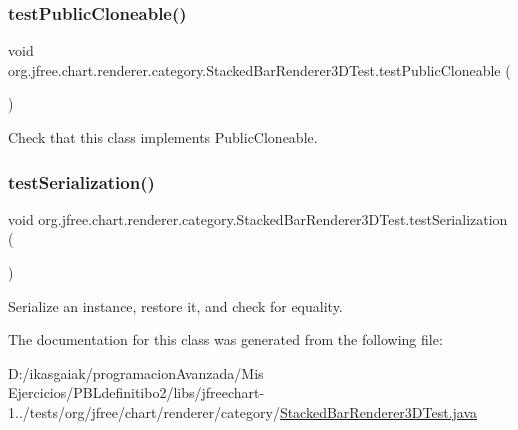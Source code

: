 \subsubsection{\texorpdfstring{test\+Public\+Cloneable()}{testPublicCloneable()}}
{\footnotesize\ttfamily void org.\+jfree.\+chart.\+renderer.\+category.\+Stacked\+Bar\+Renderer3\+D\+Test.\+test\+Public\+Cloneable (\begin{DoxyParamCaption}{ }\end{DoxyParamCaption})}

Check that this class implements Public\+Cloneable. \mbox{\label{classorg_1_1jfree_1_1chart_1_1renderer_1_1category_1_1_stacked_bar_renderer3_d_test_a4320210eab78d4e2d21fed05ef2e74b2}} 
\subsubsection{\texorpdfstring{test\+Serialization()}{testSerialization()}}
{\footnotesize\ttfamily void org.\+jfree.\+chart.\+renderer.\+category.\+Stacked\+Bar\+Renderer3\+D\+Test.\+test\+Serialization (\begin{DoxyParamCaption}{ }\end{DoxyParamCaption})}

Serialize an instance, restore it, and check for equality. 

The documentation for this class was generated from the following file\+:\begin{DoxyCompactItemize}
\item 
D\+:/ikasgaiak/programacion\+Avanzada/\+Mis Ejercicios/\+P\+B\+Ldefinitibo2/libs/jfreechart-\/1../tests/org/jfree/chart/renderer/category/\mbox{\hyperlink{_stacked_bar_renderer3_d_test_8java}{Stacked\+Bar\+Renderer3\+D\+Test.\+java}}\end{DoxyCompactItemize}
